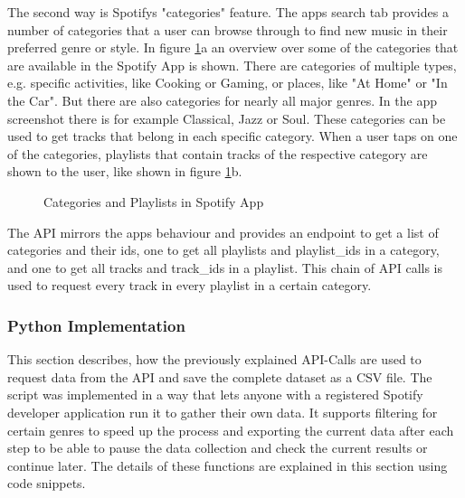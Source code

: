 The second way is Spotifys "categories" feature. The apps search tab provides a number of
categories that a user can browse through to find new music in their preferred genre or style.
In figure \ref{fig:Categories and Playlists in Spotify App}a an overview over some of the categories
that are available in the Spotify App is shown. There are categories of multiple types, e.g.
specific activities, like Cooking or Gaming, or places, like "At Home" or "In the Car".
But there are also categories for nearly all major genres. In the app screenshot
there is for example Classical, Jazz or Soul.
These categories can be used to get tracks that belong in each specific category. When a user taps on
one of the categories, playlists that contain tracks of the respective category are shown to the user,
like shown in figure \ref{fig:Categories and Playlists in Spotify App}b.

\begin{figure}[H]
    \centering
    \qquad
    \caption{Categories and Playlists in Spotify App}%
    \label{fig:Categories and Playlists in Spotify App}%
\end{figure}

The API mirrors the apps behaviour and provides an endpoint to get a list of categories and their ids,
one to get all playlists and playlist\_ids in a category, and one to get all tracks and track\_ids in
a playlist. This chain of API calls is used to request every track in every playlist in a certain category.


\subsubsection{Python Implementation}

This section describes, how the previously explained API-Calls are used to request data from the API
and save the complete dataset as a CSV file. The script was implemented in a way that lets anyone with a registered Spotify
developer application run it to gather their own data.
It supports filtering for certain genres to speed up the process and exporting the current data after each step
to be able to pause the data collection and check the current results or continue later.
The details of these functions are explained in this section using code snippets.


